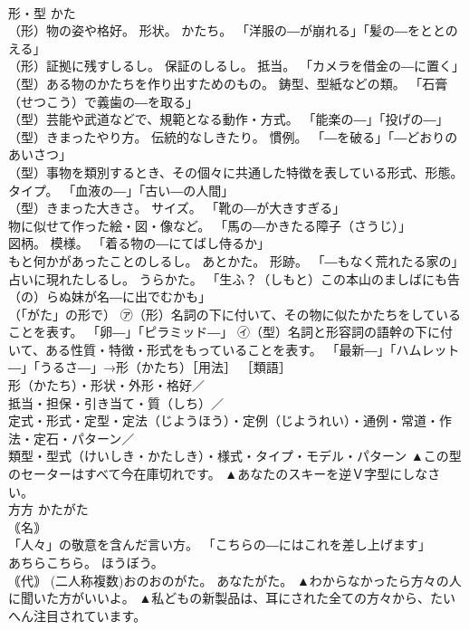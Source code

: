 \documentclass[8pt]{extreport}
\begin{document}
\begin{CJK}{UTF8}{min}
\\	形・型	かた	
\\	（形）物の姿や格好。 形状。 かたち。 「洋服の―が崩れる」「髪の―をととのえる」 
\\	（形）証拠に残すしるし。 保証のしるし。 抵当。 「カメラを借金の―に置く」 
\\	（型）ある物のかたちを作り出すためのもの。 鋳型、型紙などの類。 「石膏（せつこう）で義歯の―を取る」 
\\	（型）芸能や武道などで、規範となる動作・方式。 「能楽の―」「投げの―」 
\\	（型）きまったやり方。 伝統的なしきたり。 慣例。 「―を破る」「―どおりのあいさつ」 
\\	（型）事物を類別するとき、その個々に共通した特徴を表している形式、形態。 タイプ。 「血液の―」「古い―の人間」 
\\	（型）きまった大きさ。 サイズ。 「靴の―が大きすぎる」 
\\	物に似せて作った絵・図・像など。 「馬の―かきたる障子（さうじ）」 
\\	図柄。 模様。 「着る物の―にてばし侍るか」 
\\	もと何かがあったことのしるし。 あとかた。 形跡。 「―もなく荒れたる家の」 
\\	占いに現れたしるし。 うらかた。 「生ふ？（しもと）この本山のましばにも告（の）らぬ妹が名―に出でむかも」 
\\	（「がた」の形で） ㋐（形）名詞の下に付いて、その物に似たかたちをしていることを表す。 「卵―」「ピラミッド―」 ㋑（型）名詞と形容詞の語幹の下に付いて、ある性質・特徴・形式をもっていることを表す。 「最新―」「ハムレット―」「うるさ―」→形（かたち）［用法］ ［類語］
\\	形（かたち）・形状・外形・格好／
\\	抵当・担保・引き当て・質（しち）／
\\	定式・形式・定型・定法（じようほう）・定例（じようれい）・通例・常道・作法・定石・パターン／
\\	類型・型式（けいしき・かたしき）・様式・タイプ・モデル・パターン	▲この型のセーターはすべて今在庫切れです。 ▲あなたのスキーを逆Ｖ字型にしなさい。
\\	方方	かたがた	
\\	｟名｠ 
\\	「人々」の敬意を含んだ言い方。 「こちらの―にはこれを差し上げます」 
\\	あちらこちら。 ほうぼう。 
\\	｟代｠ (二人称複数)おのおのがた。 あなたがた。	▲わからなかったら方々の人に聞いた方がいいよ。 ▲私どもの新製品は、耳にされた全ての方々から、たいへん注目されています。

\end{CJK}
\end{document}
